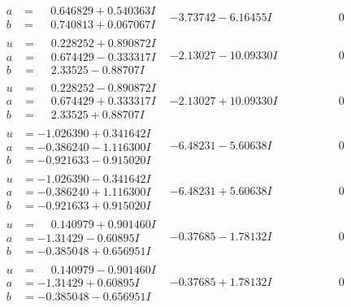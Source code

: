 \documentclass[1p]{elsarticle_modified}
\theoremstyle{definition}
\begin{document}
$$\begin{array}{c|c|c}
\begin{aligned}
a &= \phantom{-}0.646829 + 0.540363 I \\
b &= \phantom{-}0.740813 + 0.067067 I\end{aligned}
 & -3.73742 - 6.16455 I & \phantom{-0.000000 } 0 \\ \hline\begin{aligned}
u &= \phantom{-}0.228252 + 0.890872 I \\
a &= \phantom{-}0.674429 - 0.333317 I \\
b &= \phantom{-}2.33525 - 0.88707 I\end{aligned}
 & -2.13027 - 10.09330 I & \phantom{-0.000000 } 0 \\ \hline\begin{aligned}
u &= \phantom{-}0.228252 - 0.890872 I \\
a &= \phantom{-}0.674429 + 0.333317 I \\
b &= \phantom{-}2.33525 + 0.88707 I\end{aligned}
 & -2.13027 + 10.09330 I & \phantom{-0.000000 } 0 \\ \hline\begin{aligned}
u &= -1.026390 + 0.341642 I \\
a &= -0.386240 - 1.116300 I \\
b &= -0.921633 - 0.915020 I\end{aligned}
 & -6.48231 - 5.60638 I & \phantom{-0.000000 } 0 \\ \hline\begin{aligned}
u &= -1.026390 - 0.341642 I \\
a &= -0.386240 + 1.116300 I \\
b &= -0.921633 + 0.915020 I\end{aligned}
 & -6.48231 + 5.60638 I & \phantom{-0.000000 } 0 \\ \hline\begin{aligned}
u &= \phantom{-}0.140979 + 0.901460 I \\
a &= -1.31429 - 0.60895 I \\
b &= -0.385048 + 0.656951 I\end{aligned}
 & -0.37685 - 1.78132 I & \phantom{-0.000000 } 0 \\ \hline\begin{aligned}
u &= \phantom{-}0.140979 - 0.901460 I \\
a &= -1.31429 + 0.60895 I \\
b &= -0.385048 - 0.656951 I\end{aligned}
 & -0.37685 + 1.78132 I & \phantom{-0.000000 } 0 \\ \hline\begin{aligned}

\end{aligned}
\end{array}$$
\end{document}
